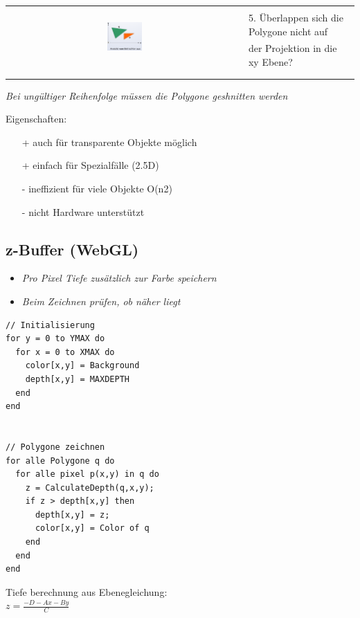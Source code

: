 \begin{tabular}{cl}
  \multirow{3}{*}{
    \includegraphics[width=0.15\textwidth]{assets/paintersalg-polygon-overlapping.png}
  } & \\
  & 5. Überlappen sich die Polygone nicht auf \\
  & der Projektion in die xy Ebene? \\
  & \\
  & \\
\end{tabular}

\textit{Bei ungültiger Reihenfolge müssen die Polygone geshnitten werden}

Eigenschaften:
\begin{itemize}
  \item[+] auch für transparente Objekte möglich
  \item[+] einfach für Spezialfälle (2.5D)
  \item[-] ineffizient für viele Objekte O(n2)
  \item[-] nicht Hardware unterstützt
\end{itemize}

\subsection{z-Buffer (WebGL)}
\begin{itemize}
  \item \textit{Pro Pixel Tiefe zusätzlich zur Farbe speichern}
  \item \textit{Beim Zeichnen prüfen, ob näher liegt}
\end{itemize}

\begin{lstlisting}
// Initialisierung
for y = 0 to YMAX do
  for x = 0 to XMAX do
    color[x,y] = Background
    depth[x,y] = MAXDEPTH
  end
end


// Polygone zeichnen
for alle Polygone q do
  for alle pixel p(x,y) in q do
    z = CalculateDepth(q,x,y);
    if z > depth[x,y] then
      depth[x,y] = z;
      color[x,y] = Color of q
    end
  end
end
\end{lstlisting}

Tiefe berechnung aus Ebenegleichung: \\
$z = \frac{-D - Ax - By}{C}$ \\

